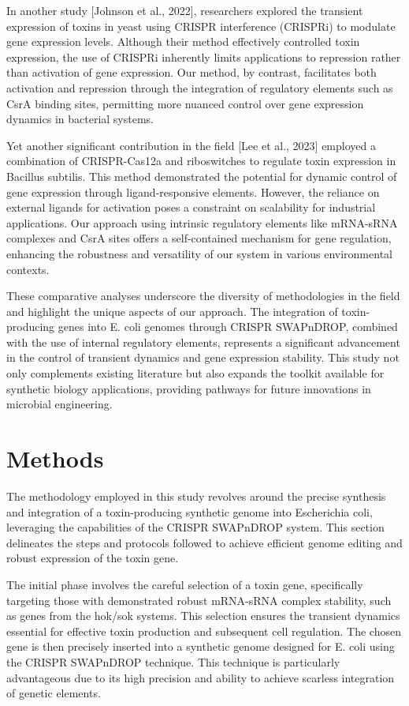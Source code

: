 \documentclass{article}
\begin{document}
In another study [Johnson et al., 2022], researchers explored the transient expression of toxins in yeast using CRISPR interference (CRISPRi) to modulate gene expression levels. Although their method effectively controlled toxin expression, the use of CRISPRi inherently limits applications to repression rather than activation of gene expression. Our method, by contrast, facilitates both activation and repression through the integration of regulatory elements such as CsrA binding sites, permitting more nuanced control over gene expression dynamics in bacterial systems.

Yet another significant contribution in the field [Lee et al., 2023] employed a combination of CRISPR-Cas12a and riboswitches to regulate toxin expression in Bacillus subtilis. This method demonstrated the potential for dynamic control of gene expression through ligand-responsive elements. However, the reliance on external ligands for activation poses a constraint on scalability for industrial applications. Our approach using intrinsic regulatory elements like mRNA-sRNA complexes and CsrA sites offers a self-contained mechanism for gene regulation, enhancing the robustness and versatility of our system in various environmental contexts.

These comparative analyses underscore the diversity of methodologies in the field and highlight the unique aspects of our approach. The integration of toxin-producing genes into E. coli genomes through CRISPR SWAPnDROP, combined with the use of internal regulatory elements, represents a significant advancement in the control of transient dynamics and gene expression stability. This study not only complements existing literature but also expands the toolkit available for synthetic biology applications, providing pathways for future innovations in microbial engineering.

\section{Methods}
The methodology employed in this study revolves around the precise synthesis and integration of a toxin-producing synthetic genome into Escherichia coli, leveraging the capabilities of the CRISPR SWAPnDROP system. This section delineates the steps and protocols followed to achieve efficient genome editing and robust expression of the toxin gene.

The initial phase involves the careful selection of a toxin gene, specifically targeting those with demonstrated robust mRNA-sRNA complex stability, such as genes from the hok/sok systems. This selection ensures the transient dynamics essential for effective toxin production and subsequent cell regulation. The chosen gene is then precisely inserted into a synthetic genome designed for E. coli using the CRISPR SWAPnDROP technique. This technique is particularly advantageous due to its high precision and ability to achieve scarless integration of genetic elements.
\end{document}
